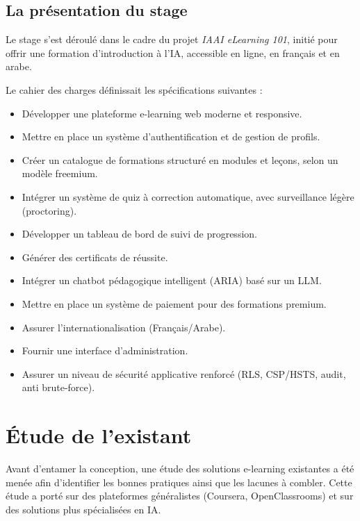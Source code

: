 \documentclass[12pt, a4paper]{report}
\begin{document}
\subsection{La présentation du stage}
Le stage s'est déroulé dans le cadre du projet \textit{IAAI eLearning 101}, initié pour offrir une formation d'introduction à l'IA, accessible en ligne, en français et en arabe.

Le cahier des charges définissait les spécifications suivantes :
\begin{itemize}
    \item Développer une plateforme e-learning web moderne et responsive.
    \item Mettre en place un système d'authentification et de gestion de profils.
    \item Créer un catalogue de formations structuré en modules et leçons, selon un modèle freemium.
    \item Intégrer un système de quiz à correction automatique, avec surveillance légère (proctoring).
    \item Développer un tableau de bord de suivi de progression.
    \item Générer des certificats de réussite.
    \item Intégrer un chatbot pédagogique intelligent (ARIA) basé sur un LLM.
    \item Mettre en place un système de paiement pour des formations premium.
    \item Assurer l'internationalisation (Français/Arabe).
    \item Fournir une interface d'administration.
    \item Assurer un niveau de sécurité applicative renforcé (RLS, CSP/HSTS, audit, anti brute-force).
\end{itemize}

\section{Étude de l'existant}
Avant d'entamer la conception, une étude des solutions e-learning existantes a été menée afin d'identifier les bonnes pratiques ainsi que les lacunes à combler. Cette étude a porté sur des plateformes généralistes (Coursera, OpenClassrooms) et sur des solutions plus spécialisées en IA.
\end{document}
